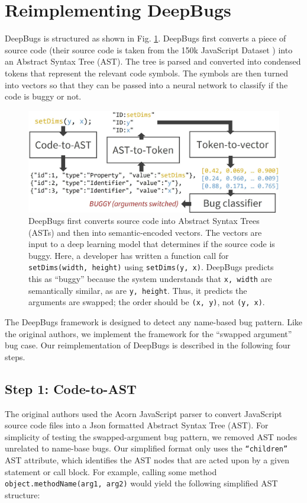 \section{Reimplementing DeepBugs}
\label{sec:replicating_deepbugs}

DeepBugs is structured as shown in Fig. \ref{fig:deepbugs-overview}. DeepBugs first converts a piece of source code (their source code is taken from the 150k JavaScript Dataset \cite{noauthor_150k_nodate}) into an Abstract Syntax Tree (AST). %
The tree is parsed and converted into condensed tokens that represent the relevant code symbols. The symbols are then turned into vectors so that they can be passed into a neural network to classify if the code is buggy or not.

\begin{figure}[h]
    \centering
    \includegraphics[width=\linewidth]{images/deepbugs-overview.jpg}
    \caption{DeepBugs first converts source code into Abstract Syntax Trees (ASTs) and then into semantic-encoded vectors. The vectors are input to a deep learning model that determines if the source code is buggy. Here, a developer has written a function call for \texttt{setDims(width, height)} using \texttt{setDims(y, x)}. DeepBugs predicts this as ``buggy'' because the system understands that \texttt{x, width} are semantically similar, as are \texttt{y, height}. Thus, it predicts the arguments are swapped; the order should be \texttt{(x, y)}, not \texttt{(y, x)}.}
    \label{fig:deepbugs-overview}
\end{figure}

The DeepBugs framework is designed to detect any name-based bug pattern. Like the original authors, we implement the framework for the ``swapped argument'' bug case. Our reimplementation of DeepBugs is described in the following four steps.

\subsection{Step 1: Code-to-AST}
\label{subsec:step-1}
The original authors used the Acorn JavaScript parser \cite{noauthor_acornjsacorn_2021} to convert JavaScript source code files into a Json formatted Abstract Syntax Tree (AST). For simplicity of testing the swapped-argument bug pattern, we removed AST nodes unrelated to name-base bugs. Our simplified format only uses the \texttt{``children''} AST attribute, which identifies the AST nodes that are acted upon by a given statement or call block. For example, calling some method \texttt{object.methodName(arg1, arg2)} would yield the following simplified AST structure:
\\

